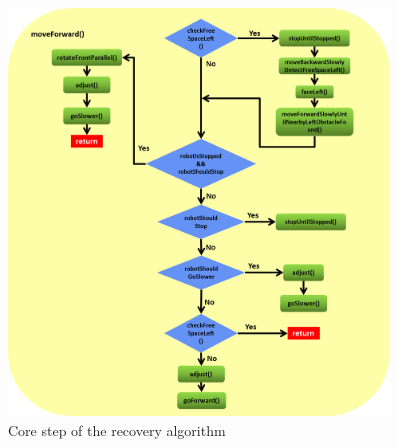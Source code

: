 \begin{figure}[ht]
\centering
\includegraphics[width=0.9\textwidth]{graphics/move_forward.png}
\caption{Core step of the recovery algorithm}
\label{move_forward}
\centering
\end{figure}

